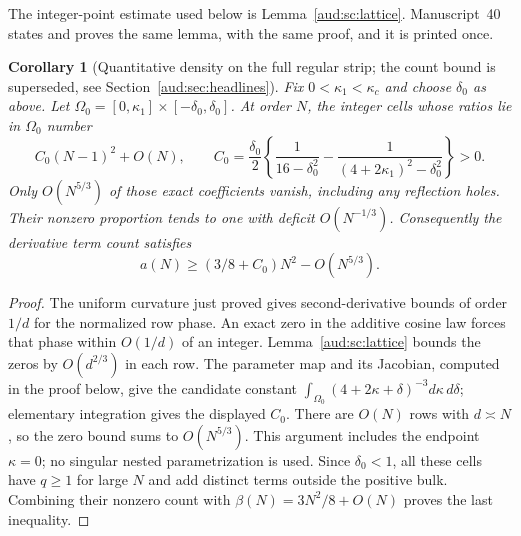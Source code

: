 \documentclass[11pt,a4paper]{article}
\numberwithin{equation}{section}
\newtheorem{corollary}[theorem]{Corollary}
\begin{document}
The integer-point estimate used below is Lemma~\ref{aud:sc:lattice}. Manuscript~40 states and proves the same lemma, with the same proof, and it is printed once.


\begin{corollary}[Quantitative density on the full regular strip; the count bound is superseded, see Section~\ref{aud:sec:headlines}]\label{aud:dc:stripdensity}
Fix $0<\kappa_1<\kappa_c$ and choose $\delta_0$ as above. Let $\Omega_0=[0,\kappa_1]\times[-\delta_0,\delta_0]$. At order $N$, the integer cells whose ratios lie in $\Omega_0$ number
\[
 C_0(N-1)^2+O(N),\qquad
 C_0=\frac{\delta_0}{2}\left\{\frac1{16-\delta_0^2}-\frac1{(4+2\kappa_1)^2-\delta_0^2}\right\}>0.
\]
Only $O(N^{5/3})$ of those exact coefficients vanish, including any reflection holes. Their nonzero proportion tends to one with deficit $O(N^{-1/3})$. Consequently the derivative term count satisfies
\[
 a(N)\ge(3/8+C_0)N^2-O(N^{5/3}).
\]
\end{corollary}
\begin{proof}
The uniform curvature just proved gives second-derivative bounds of order $1/d$ for the normalized row phase. An exact zero in the additive cosine law forces that phase within $O(1/d)$ of an integer. Lemma~\ref{aud:sc:lattice} bounds the zeros by $O(d^{2/3})$ in each row. The parameter map and its Jacobian, computed in the proof below, give the candidate constant $\int_{\Omega_0}(4+2\kappa+\delta)^{-3}d\kappa\,d\delta$; elementary integration gives the displayed $C_0$. There are $O(N)$ rows with $d\asymp N$, so the zero bound sums to $O(N^{5/3})$. This argument includes the endpoint $\kappa=0$; no singular nested parametrization is used. Since $\delta_0<1$, all these cells have $q\ge1$ for large $N$ and add distinct terms outside the positive bulk. Combining their nonzero count with $\beta(N)=3N^2/8+O(N)$ proves the last inequality.
\end{proof}
\end{document}
